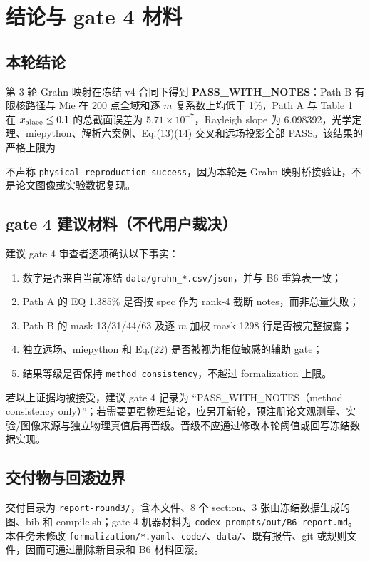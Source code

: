 \section{结论与 gate 4 材料}

\subsection{本轮结论}

第 3 轮 Grahn 映射在冻结 v4 合同下得到 \textbf{PASS\_WITH\_NOTES}：Path B 有限核路径与 Mie 在 200 点全域和逐 $m$ 复系数上均低于 1\%，Path A 与 Table 1 在 $x_{\rm alaee}\le0.1$ 的总截面误差为 $5.71\times10^{-7}$，Rayleigh slope 为 6.098392，光学定理、miepython、解析六案例、Eq.(13)(14) 交叉和远场投影全部 PASS。该结果的严格上限为
\begin{center}
\end{center}
不声称 \texttt{physical\_reproduction\_success}，因为本轮是 Grahn 映射桥接验证，不是论文图像或实验数据复现。

\subsection{gate 4 建议材料（不代用户裁决）}

建议 gate 4 审查者逐项确认以下事实：
\begin{enumerate}
 \item 数字是否来自当前冻结 \texttt{data/grahn\_*.csv/json}，并与 B6 重算表一致；
 \item Path A 的 EQ 1.385\% 是否按 spec 作为 rank-4 截断 notes，而非总量失败；
 \item Path B 的 mask 13/31/44/63 及逐 $m$ 加权 mask 1298 行是否被完整披露；
 \item 独立远场、miepython 和 Eq.(22) 是否被视为相位敏感的辅助 gate；
 \item 结果等级是否保持 \texttt{method\_consistency}，不越过 formalization 上限。
\end{enumerate}
若以上证据均被接受，建议 gate 4 记录为 ``PASS\_WITH\_NOTES（method consistency only）''；若需要更强物理结论，应另开新轮，预注册论文观测量、实验/图像来源与独立物理真值后再晋级。晋级不应通过修改本轮阈值或回写冻结数据实现。

\subsection{交付物与回滚边界}

交付目录为 \texttt{report-round3/}，含本文件、8 个 section、3 张由冻结数据生成的图、bib 和 compile.sh；gate 4 机器材料为 \texttt{codex-prompts/out/B6-report.md}。本任务未修改 \texttt{formalization/*.yaml}、\texttt{code/}、\texttt{data/}、既有报告、git 或规则文件，因而可通过删除新目录和 B6 材料回滚。
